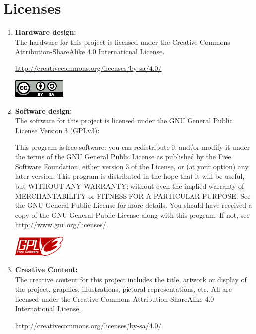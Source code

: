 \documentclass[bibtotocnumbered,abstract=on,paper=a4,fontsize=12pt,parskip=on,halfparskip=on]{scrartcl}		%
\begin{document}
\section{Licenses}
\begin{enumerate}

  \item{\textbf{Hardware design:}}\hfill \\
    The hardware for this project is licensed under the Creative Commons Attribution-ShareAlike 4.0 International License.

    \url{http://creativecommons.org/licenses/by-sa/4.0/}

    \includegraphics[width=1in]{img/by-sa.eps}

  \item{\textbf{Software design:}}\hfill \\
    The software for this project is licensed under the GNU General Public License Version 3 (GPLv3):

    This program is free software: you can redistribute it and/or modify
    it under the terms of the GNU General Public License as published by
    the Free Software Foundation, either version 3 of the License, or
    (at your option) any later version.
    This program is distributed in the hope that it will be useful,
    but WITHOUT ANY WARRANTY; without even the implied warranty of
    MERCHANTABILITY or FITNESS FOR A PARTICULAR PURPOSE.  See the
    GNU General Public License for more details.
    You should have received a copy of the GNU General Public License
    along with this program.  If not, see \url{http://www.gnu.org/licenses/}.
      
    \includegraphics[width=1in]{img/gpl_logo.png}


    \item{\textbf{Creative Content:}}\hfill \\
    The creative content for this project includes the title, artwork or display of the project, graphics, illustrations, pictoral representations, etc. All are licensed under the Creative Commons Attribution-ShareAlike 4.0 International License.

    \url{http://creativecommons.org/licenses/by-sa/4.0/}


\end{enumerate}
\end{document}

